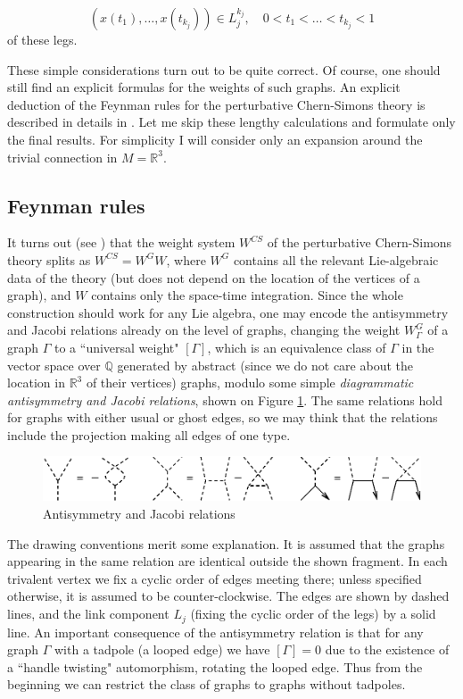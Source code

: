 \documentclass[10pt]{amsart}
\theoremstyle{definition}
\theoremstyle{remark}
\newcommand{\Q}{\mathbb Q}
\newcommand{\R}{\mathbb R}
\newcommand{\GG}{\Gamma}
\begin{document}
 $$
    (x(t_1), \dots, x(t_{k_j}))\in  L_j^{k_j},\quad   0<t_1<\dots<t_{k_j}<1
$$ of these legs.

These simple considerations turn out to be quite correct. Of
course, one should still find an explicit formulas for the weights
of such graphs. An explicit deduction of the Feynman rules for the
perturbative Chern-Simons theory is described in details in
\cite{BN,GMM}. Let me skip these lengthy calculations and
formulate only the final results. For simplicity I will consider
only an expansion around the trivial connection in $M=\R^3$.

\subsection{Feynman rules}
It turns out (see \cite{BN}) that the weight system
$W^{CS}$ of the perturbative Chern-Simons theory splits as
$W^{CS}=W^G W$, where $W^G$ contains all the relevant Lie-algebraic
data of the theory (but does not depend on the location of the
vertices of a graph), and $W$ contains only the space-time
integration. Since the whole construction should work for any Lie
algebra, one may encode the antisymmetry and Jacobi relations
already on the level of graphs, changing the weight $W_\GG^G$ of
a graph $\GG$ to a ``universal weight" $[\GG]$, which is an
equivalence class of $\GG$ in the vector space over $\Q$
generated by abstract (since we do not care about the location
in $\R^3$ of their vertices) graphs, modulo some simple
{\em diagrammatic antisymmetry and Jacobi relations}, shown on
Figure \ref{fig:rels}. The same relations hold for graphs with
either usual or ghost edges, so we may think that the relations
include the projection making all edges of one type.

\begin{figure}[htb]
\includegraphics[width=5.0in]{rels.eps}
\caption{Antisymmetry and Jacobi relations} \label{fig:rels}
\end{figure}

The drawing conventions merit some explanation. It is assumed that
the graphs appearing in the same relation are identical outside
the shown fragment. In each trivalent vertex we fix a cyclic order
of edges meeting there; unless specified otherwise, it is assumed
to be counter-clockwise. The edges are shown by dashed lines, and
the link component $L_j$ (fixing the cyclic order of the legs) by
a solid line. An important consequence of the antisymmetry
relation is that for any graph $\GG$ with a tadpole (a looped edge)
we have $[\GG]=0$ due to the existence of a ``handle twisting"
automorphism, rotating the looped edge. Thus from the beginning we
can restrict the class of graphs to graphs without tadpoles.
\end{document}
